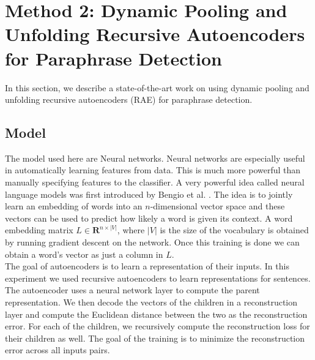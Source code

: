 \documentclass[conference]{IEEEtran}
\begin{document}
\section{Method 2: Dynamic Pooling and Unfolding Recursive Autoencoders for Paraphrase Detection}
In this section, we describe a state-of-the-art work \cite{richard} on using dynamic pooling and unfolding recursive autoencoders (RAE) for paraphrase detection.\\
\subsection{Model}
The model used here are Neural networks. Neural networks are especially useful in automatically learning features from data. This is much more powerful than manually specifying features to the classifier. A very powerful idea called neural language models was first introduced by Bengio et al. \cite{bengio}. The idea is to jointly learn an embedding of words into an $n$-dimensional vector space and these vectors can be used to predict how likely a word is given its context. A word embedding matrix $L \in \mathbf{R}^{n \times |V|}$, where $|V|$ is the size of the vocabulary is obtained by running gradient descent on the network. Once this training is done we can obtain a word's vector as just a column in $L$.\\
The goal of autoencoders is to learn a representation of their inputs. In this experiment we used recursive autoencoders to learn representations for sentences. The autoencoder uses a neural network layer to compute the parent representation. We then decode the vectors of the children in a reconstruction layer and compute the Euclidean distance between the two as the reconstruction error. For each of the children, we recursively compute the reconstruction loss for their children as well. The goal of the training is to minimize the reconstruction error across all inputs pairs. 
\end{document}
